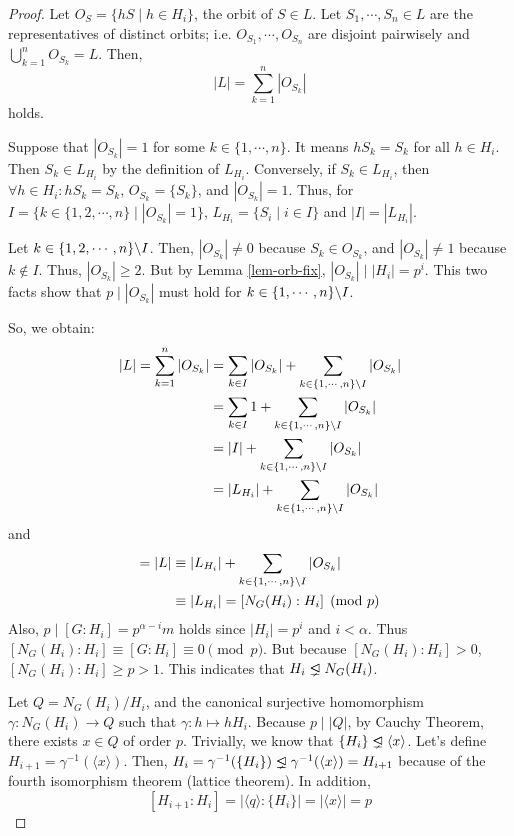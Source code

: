 \documentclass{article}
\newcommand{\bs}{\char`\\}
\newcommand{\triangleleftneq}{\mathrel{\ooalign{$\lneq$\cr\raise.22ex\hbox{$\lhd$}\cr}}}
\begin{document}
\begin{proof}
  Let \(O_{S} = \{h S \mid h \in H_i\}\), the orbit of \(S \in L\).
  Let \(S_1, \cdots, S_n \in L\) are the representatives of distinct orbits; i.e. \(O_{S_1}, \cdots, O_{S_n}\) are disjoint pairwisely and \(\bigcup_{k = 1}^{n} O_{S_k} = L\).
  Then,
  \[|L| = \sum_{k=1}^{n} |O_{S_k}|\]
  holds.
  
  Suppose that \(|O_{S_k}| = 1\) for some \(k \in \{1, \cdots, n\}\).
  It means \(h S_k = S_k\) for all \(h \in H_i\).
  Then \(S_k \in L_{H_i}\) by the definition of \(L_{H_i}\).
  Conversely, if \(S_k \in L_{H_i}\), then \(\forall h \in H_i: h S_k = S_k\), \(O_{S_k} = \{S_k\}\), and \(|O_{S_k}| = 1\).
  Thus, for \(I = \{k \in \{1, 2, \cdots, n\} \mid |O_{S_k}| = 1\}\), \(L_{H_i} = \{S_i \mid i \in I\}\) and \(|I| = |L_{H_i}|\).

  Let \(k \in \{1, 2, \cdots, n\} \bs I\). Then, \(|O_{S_k}| \neq 0\) because \(S_k \in O_{S_k}\), and \(|O_{S_k}| \neq 1\) because \(k \not\in I\). Thus, \(|O_{S_k}| \ge 2\). But by Lemma \ref{lem-orb-fix}, \(|O_{S_k}| \mid |H_i| = p^i\). This two facts show that \(p \mid |O_{S_k}|\) must hold for \(k \in \{1, \cdots, n\} \bs I\).

  So, we obtain:
  \begin{align*}
    |L| = \sum_{k=1}^{n} |O_{S_k}|
    &= \sum_{k \in I} |O_{S_k}| + \sum_{k \in \{1, \cdots, n\} \bs I} |O_{S_k}|
    \\&= \sum_{k \in I} 1 + \sum_{k \in \{1, \cdots, n\} \bs I} |O_{S_k}|
    \\&= |I| + \sum_{k \in \{1, \cdots, n\} \bs I} |O_{S_k}|
    \\&= |L_{H_i}| + \sum_{k \in \{1, \cdots, n\} \bs I} |O_{S_k}|
  \end{align*}
  and
  \begin{align*}
    [G : H_i] = |L|
    &\equiv |L_{H_i}| + \sum_{k \in \{1, \cdots, n\} \bs I} |O_{S_k}|
    \\&\equiv |L_{H_i}| = [N_G(H_i) : H_i] \pmod{p}
  \end{align*}
  Also, \(p \mid [G : H_i] = p^{\alpha - i} m\) holds since \(|H_i| = p^i\) and \(i < \alpha\). Thus \([N_G(H_i) : H_i] \equiv [G : H_i] \equiv 0 \pmod{p}\).
  But because \([N_G(H_i) : H_i] > 0\), \([N_G(H_i) : H_i] \ge p > 1\).
  This indicates that \(H_i \triangleleftneq N_G(H_i)\).
  \newline

  Let \(Q = N_G(H_i) / H_i\), and the canonical surjective homomorphism \(\gamma: N_G(H_i) \to Q\) such that \(\gamma: h \mapsto h H_i\).
  Because \(p \mid |Q|\), by Cauchy Theorem, there exists \(x \in Q\) of order \(p\).
  Trivially, we know that \(\{H_i\} \triangleleftneq \langle x \rangle\).
  Let's define \(H_{i + 1} = \gamma^{-1}(\langle x \rangle)\).
  Then, \(H_{i} = \gamma^{-1}(\{H_i\}) \triangleleftneq \gamma^{-1}(\langle x \rangle) = H_{i + 1}\) because of the fourth isomorphism theorem (lattice theorem).
  In addition,
  \[[H_{i + 1} : H_i] = |\langle q \rangle : \{H_i\}| = |\langle x \rangle| = p\]


\end{proof}
\end{document}
